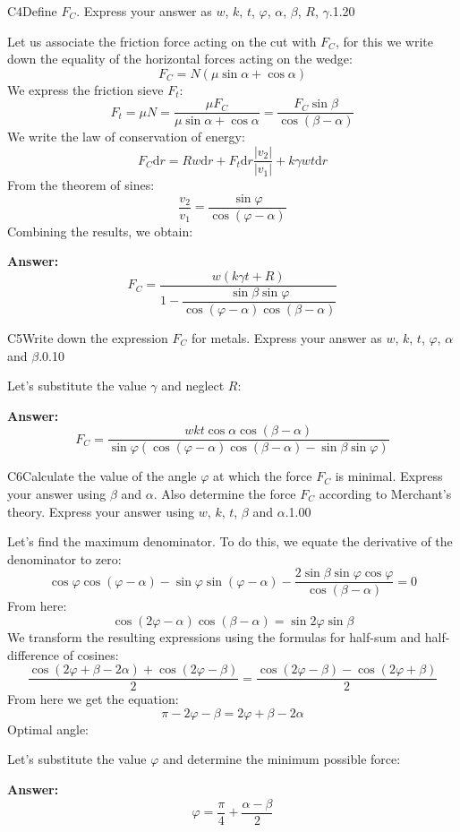 \documentclass[11pt,a4paper]{article}
\begin{document}
\begin{solcard}{C4}{Define $F_C$. Express your answer as $w$, $k$, $t$, $\varphi$, $\alpha$, $\beta$, $R$, $\gamma$.}{1.20}

Let us associate the friction force acting on the cut with $F_C$, for this we write down the equality of the horizontal forces acting on the wedge: \[F_C=N(\mu\sin\alpha+\cos\alpha)\]We express the friction sieve $F_t$: \[F_t=\mu N=\dfrac{\mu F_C}{\mu\sin\alpha+\cos\alpha}=\dfrac{F_C\sin\beta}{\cos(\beta-\alpha)}\]We write the law of conservation of energy: \[F_C\mathrm dr=Rw\mathrm dr+F_t\mathrm dr\dfrac{|v_2|}{|v_1|}+k\gamma wt\mathrm dr\]From the theorem of sines: \[\dfrac{v_2}{v_1}=\dfrac{\sin\varphi}{\cos(\varphi-\alpha)}\]Combining the results, we obtain:

\par\smallskip\noindent\textbf{Answer:} \[F_C=\dfrac{w(k\gamma t+R)}{1-\dfrac{\sin\beta\sin\varphi}{\cos(\varphi-\alpha)\cos(\beta-\alpha)}}\]
\end{solcard}

\begin{solcard}{C5}{Write down the expression $F_C$ for metals. Express your answer as $w$, $k$, $t$, $\varphi$, $\alpha$ and $\beta$.}{0.10}

Let's substitute the value $\gamma$ and neglect $R$:

\par\smallskip\noindent\textbf{Answer:} \[F_C=\dfrac{wkt\cos\alpha\cos(\beta-\alpha)}{\sin\varphi(\cos(\varphi-\alpha)\cos(\beta-\alpha)-\sin\beta\sin\varphi)}\]
\end{solcard}

\begin{solcard}{C6}{Calculate the value of the angle $\varphi$ at which the force $F_C$ is minimal. Express your answer using $\beta$ and $\alpha$. Also determine the force $F_C$ according to Merchant's theory. Express your answer using $w$, $k$, $t$, $\beta$ and $\alpha$.}{1.00}

Let's find the maximum denominator. To do this, we equate the derivative of the denominator to zero: \[\cos\varphi\cos(\varphi-\alpha)-\sin\varphi\sin(\varphi-\alpha)-\dfrac{2\sin\beta\sin\varphi\cos\varphi}{\cos(\beta-\alpha)}=0\]From here: \[\cos(2\varphi-\alpha)\cos(\beta-\alpha)=\sin 2\varphi\sin\beta\]We transform the resulting expressions using the formulas for half-sum and half-difference of cosines: \[\dfrac{\cos(2\varphi+\beta-2\alpha)+\cos(2\varphi-\beta)}{2}=\dfrac{\cos(2\varphi-\beta)-\cos(2\varphi+\beta)}{2}\]From here we get the equation: \[\pi-2\varphi-\beta=2\varphi+\beta-2\alpha\]Optimal angle:


Let's substitute the value $\varphi$ and determine the minimum possible force:

\par\smallskip\noindent\textbf{Answer:} \[\varphi=\dfrac{\pi}{4}+\dfrac{\alpha-\beta}{2}\]
\end{solcard}
\end{document}
